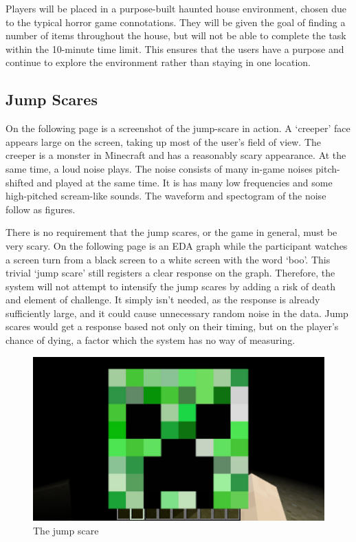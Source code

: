 \documentclass[12pt,a4paper]{article}
\begin{document}
Players will be placed in a purpose-built haunted house environment, chosen due to the typical horror game connotations. They will be given the goal of finding a number of items throughout the house, but will not be able to complete the task within the 10-minute time limit. This ensures that the users have a purpose and continue to explore the environment rather than staying in one location.

\subsection{Jump Scares}
On the following page is a screenshot of the jump-scare in action. A `creeper' face appears large on the screen, taking up most of the user's field of view. The creeper is a monster in Minecraft and has a reasonably scary appearance. At the same time, a loud noise plays. The noise consists of many in-game noises pitch-shifted and played at the same time. It is has many low frequencies and some high-pitched scream-like sounds. The waveform and spectogram of the noise follow as figures.

There is no requirement that the jump scares, or the game in general, must be very scary. On the following page is an EDA graph while the participant watches a screen turn from a black screen to a white screen with the word `boo'. This trivial `jump scare' still registers a clear response on the graph. Therefore, the system will not attempt to intensify the jump scares by adding a risk of death and element of challenge. It simply isn't needed, as the response is already sufficiently large, and it could cause unnecessary random noise in the data. Jump scares would get a response based not only on their timing, but on the player's chance of dying, a factor which the system has no way of measuring.
\begin{figure}[!htbp]
		\begin{center}
\includegraphics[width=0.8\linewidth]{scare.png}
\caption{The jump scare}
	\end{center}
\end{figure}
\end{document}
